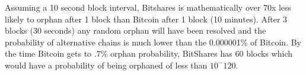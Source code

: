 Assuming a 10 second block interval, Bitshares is mathematically over 70x less
likely to orphan after 1 block than Bitcoin after 1 block (10 minutes). After 3
blocks (30 seconds) any random orphan will have been resolved and the
probability of alternative chains is much lower than the 0.000001\% of Bitcoin.
By the time Bitcoin gets to .7\% orphan probability, BitShares has 60 blocks
which would have a probability of being orphaned of less than $10^-{120}$.

